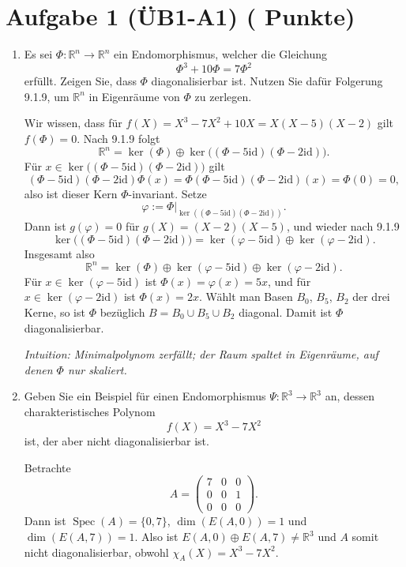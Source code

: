 \documentclass[11pt, a4paper]{article}
\newcommand{\aufgabe}[2]{%
  \section*{\Large\bfseries Aufgabe #1%
  \if\relax\detokenize{#2}\relax\else \hfill\normalfont\normalsize(#2 Punkte)\fi}%
  \vspace{-1.5ex}
}
\begin{document}
\aufgabe{1 (ÜB1-A1)}{}
\begin{enumerate}
  \item Es sei $\Phi:\mathbb{R}^n\to\mathbb{R}^n$ ein Endomorphismus, welcher die Gleichung
  \[
    \Phi^3+10\Phi=7\Phi^2
  \]
  erfüllt. Zeigen Sie, dass $\Phi$ diagonalisierbar ist. Nutzen Sie dafür Folgerung 9.1.9, um $\mathbb{R}^n$ in Eigenräume von $\Phi$ zu zerlegen.
  \begin{framed}
  Wir wissen, dass für $f(X)=X^3-7X^2+10X=X(X-5)(X-2)$ gilt $f(\Phi)=0$. Nach 9.1.9 folgt
  \[
    \mathbb{R}^n=\ker(\Phi)\oplus\ker\!\big((\Phi-5\mathrm{id})(\Phi-2\mathrm{id})\big).
  \]
  Für $x\in\ker\!\big((\Phi-5\mathrm{id})(\Phi-2\mathrm{id})\big)$ gilt
  \[
    (\Phi-5\mathrm{id})(\Phi-2\mathrm{id})\Phi(x)
     =\Phi(\Phi-5\mathrm{id})(\Phi-2\mathrm{id})(x)=\Phi(0)=0,
  \]
  also ist dieser Kern $\Phi$-invariant. Setze
  \[
    \varphi:=\Phi\big|_{\ker((\Phi-5\mathrm{id})(\Phi-2\mathrm{id}))}.
  \]
  Dann ist $g(\varphi)=0$ für $g(X)=(X-2)(X-5)$, und wieder nach 9.1.9
  \[
    \ker\!\big((\Phi-5\mathrm{id})(\Phi-2\mathrm{id})\big)
      =\ker(\varphi-5\mathrm{id})\oplus\ker(\varphi-2\mathrm{id}).
  \]
  Insgesamt also
  \[
    \mathbb{R}^n=\ker(\Phi)\oplus\ker(\varphi-5\mathrm{id})\oplus\ker(\varphi-2\mathrm{id}).
  \]
  Für $x\in\ker(\varphi-5\mathrm{id})$ ist $\Phi(x)=\varphi(x)=5x$, und für
  $x\in\ker(\varphi-2\mathrm{id})$ ist $\Phi(x)=2x$. Wählt man Basen $B_0$,
  $B_5$, $B_2$ der drei Kerne, so ist $\Phi$ bezüglich
  $B=B_0\cup B_5\cup B_2$ diagonal. Damit ist $\Phi$ diagonalisierbar.

  \medskip\noindent\textit{Intuition: Minimalpolynom zerfällt; der Raum spaltet in Eigenräume, auf denen $\Phi$ nur skaliert.}
  \end{framed}

  \item Geben Sie ein Beispiel für einen Endomorphismus $\Psi:\mathbb{R}^3\to\mathbb{R}^3$ an, dessen charakteristisches Polynom
  \[
    f(X)=X^3-7X^2
  \]
  ist, der aber nicht diagonalisierbar ist.
  \begin{framed}
  Betrachte
  \[
    A=\begin{pmatrix}
      7&0&0\\
      0&0&1\\
      0&0&0
    \end{pmatrix}.
  \]
  Dann ist $\operatorname{Spec}(A)=\{0,7\}$, $\dim(E(A,0))=1$ und
  $\dim(E(A,7))=1$. Also ist
  $E(A,0)\oplus E(A,7)\neq\mathbb{R}^3$ und $A$ somit nicht diagonalisierbar,
  obwohl $\chi_A(X)=X^3-7X^2$.


\end{framed}
\end{enumerate}
\end{document}
